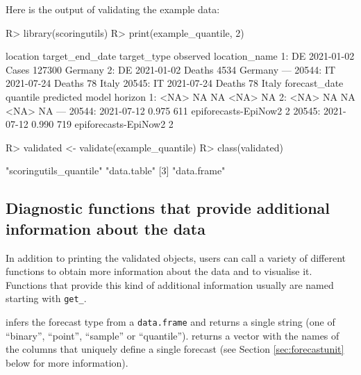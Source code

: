 \documentclass[
]{jss}
\begin{document}
Here is the output of validating the example data:

\begin{CodeChunk}
\begin{CodeInput}
R> library(scoringutils)
R> print(example_quantile, 2)
\end{CodeInput}
\begin{CodeOutput}
       location target_end_date target_type observed location_name
    1:       DE      2021-01-02       Cases   127300       Germany
    2:       DE      2021-01-02      Deaths     4534       Germany
   ---                                                            
20544:       IT      2021-07-24      Deaths       78         Italy
20545:       IT      2021-07-24      Deaths       78         Italy
       forecast_date quantile predicted                model horizon
    1:          <NA>       NA        NA                 <NA>      NA
    2:          <NA>       NA        NA                 <NA>      NA
   ---                                                              
20544:    2021-07-12    0.975       611 epiforecasts-EpiNow2       2
20545:    2021-07-12    0.990       719 epiforecasts-EpiNow2       2
\end{CodeOutput}
\begin{CodeInput}
R> validated <- validate(example_quantile) 
R> class(validated)
\end{CodeInput}
\begin{CodeOutput}
[1] "scoringutils_quantile" "data.table"           
[3] "data.frame"           
\end{CodeOutput}
\end{CodeChunk}

\subsection{Diagnostic functions that provide additional information
about the
data}\label{diagnostic-functions-that-provide-additional-information-about-the-data}

In addition to printing the validated objects, users can call a variety
of different functions to obtain more information about the data and to
visualise it. Functions that provide this kind of additional information
usually are named starting with \texttt{get\_}.

 infers the forecast type from a
\texttt{data.frame} and returns a single string (one of ``binary'',
``point'', ``sample'' or ``quantile''). 
returns a vector with the names of the columns that uniquely define a
single forecast (see Section \ref{sec:forecastunit} below for more
information).
\end{document}
